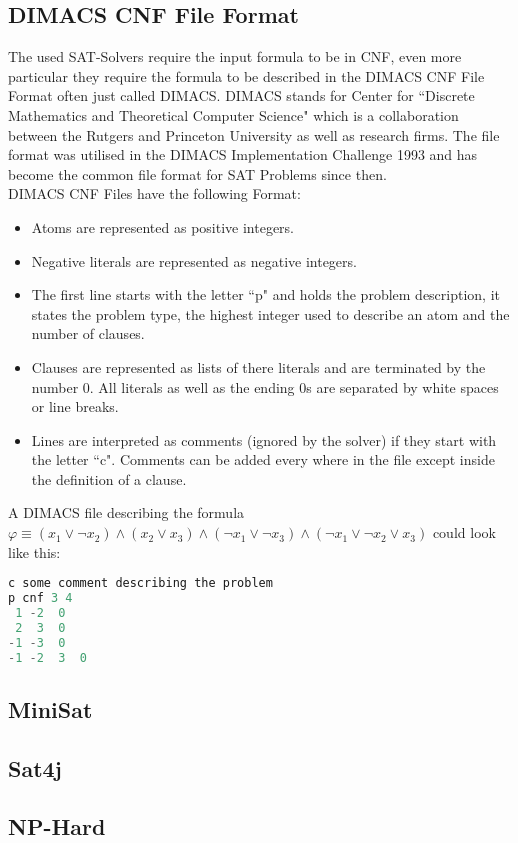 \subsection{DIMACS CNF File Format}
The used SAT-Solvers require the input formula to be in CNF, even more particular they require the formula to be described in the DIMACS CNF File Format often just called DIMACS. DIMACS stands for Center for ``Discrete Mathematics and Theoretical Computer Science" which is a collaboration between the Rutgers and Princeton University as well as research firms. The file format was utilised in the DIMACS Implementation Challenge 1993 and has become the common file format for SAT Problems since then.\\

DIMACS CNF Files have the following Format:
\begin{itemize}
    \item Atoms are represented as positive integers.
    \item Negative literals are represented as negative integers.
    \item The first line starts with the letter ``p" and holds the problem description, it states the problem type, the highest integer used to describe an atom and the number of clauses.
    \item Clauses are represented as lists of there literals and are terminated by the number 0. All literals as well as the ending 0s are separated by white spaces or line breaks.
    \item Lines are interpreted as comments (ignored by the solver) if they start with the letter ``c". Comments can be added every where in the file except inside the definition of a clause.
\end{itemize}
A DIMACS file describing the formula $\varphi \equiv (x_1 \lor \neg x_2) \land (x_2 \lor x_3) \land (\neg x_1 \lor \neg x_3) \land (\neg x_1 \lor \neg x_2 \lor x_3)$ could look like this:

\lstset{basicstyle=\ttfamily}
\begin{lstlisting}[language=Java,frame=single]
c some comment describing the problem
p cnf 3 4
 1 -2  0
 2  3  0
-1 -3  0
-1 -2  3  0
\end{lstlisting}

\subsection{MiniSat} 	
\lipsum[1]

\subsection{Sat4j} 	
\lipsum[1]

\subsection{NP-Hard}